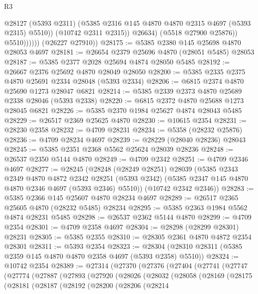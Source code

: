 \begin{lexlean}{R3}
\begin{coremodule}
                          @28127
                          (@5393 @2311)
                          (@5385 @2316 @145 @4870 @4870 @2315 @4697 (@5393 @2315) @5510))
                        (@10742 @2311 @2315))
                      @26634)
                    (@5518 @27900 @25876))
                  @5510))))))
      (@26227 @27910))
@28175 := @5385 @2380 @145 @25698 @4870 @28053 @4697
@28181 := @26654 @2379 @25696 @4870 (@28051 @5485) @28053
@28187 := @5385 @2377 @2028 @25694 @4874 @28050 @5485
@28192 := @26667 @2376 @25692 @4870 @28049 @28050
@28200 := @5385 @2335 @2375 @4870 @25691 @2334 @28048 (@5393 @2334)
@28206 := @6815 @2374 @4870 @25690 @1273 @28047 @6821
@28214 := @5385 @2339 @2373 @4870 @25689 @2338 @28046 (@5393 @2338)
@28220 := @6815 @2372 @4870 @25688 @1273 @28045 @6821
@28226 := @5385 @2370 @1984 @25627 @4874 @28043 @5485
@28229 := @26517 @2369 @25625 @4870
@28230 := @10615 @2354
@28231 := @28230 @2358
@28232 := @4709 @28231
@28234 := @5358 (@28232 @25876)
@28236 := @4709 @28234 @4697
@28239 := @28229 (@28040 @28236) @28043
@28245 := @5385 @2351 @2368 @5562 @25624 @28039 @28236
@28248 := @26537 @2350 @5144 @4870
@28249 := @4709 @2342
@28251 := @4709 @2346 @4697
@28277 := @28245
    (@28248
      (@28249 @28251)
      @28039
      (@5385
        @2343
        @2349
        @4870
        @4872
        @2342
        @28251
        (@5393 @2342)
        (@5385 @2347 @145 @4870 @4870 @2346 @4697 (@5393 @2346) @5510))
      (@10742 @2342 @2346))
@28283 := @5385 @2366 @145 @25607 @4870 @28234 @4697
@28289 := @26517 @2365 @25605 @4870 (@28232 @5485) @28234
@28295 := @5385 @2363 @1984 @5562 @4874 @28231 @5485
@28298 := @26537 @2362 @5144 @4870
@28299 := @4709 @2354
@28301 := @4709 @2358 @4697
@28304 := @28298 (@28299 @28301) @28231
@28305 := @5385 @2355
@28310 := @28305 @2361 @4870 @4872 @2354 @28301
@28311 := @5393 @2354
@28323 := @28304 (@28310 @28311 (@5385 @2359 @145 @4870 @4870 @2358 @4697 (@5393 @2358) @5510))
@28324 := @10742 @2354
@28389 := @27314
    (@27370
      (@27376
        (@27404
          (@27741
            (@27747
              (@27774
                (@27887
                  (@27893
                    (@27920
                      (@28026
                        (@28032
                          (@28058
                            (@28169
                              (@28175
                                (@28181
                                  (@28187
                                    (@28192
                                      (@28200
                                        (@28206
                                          (@28214

\end{coremodule}
\end{lexlean}
